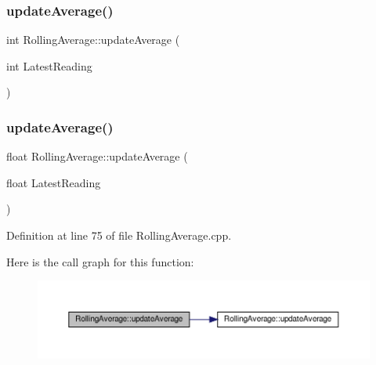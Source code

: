 \subsubsection{\texorpdfstring{update\+Average()}{updateAverage()}\hspace{0.1cm}{\footnotesize\ttfamily [2/4]}}
{\footnotesize\ttfamily int Rolling\+Average\+::update\+Average (\begin{DoxyParamCaption}\item[{int}]{Latest\+Reading }\end{DoxyParamCaption})}

\mbox{\label{class_rolling_average_a8b3550acbd16b942b565150334205d52}} 
\subsubsection{\texorpdfstring{update\+Average()}{updateAverage()}\hspace{0.1cm}{\footnotesize\ttfamily [3/4]}}
{\footnotesize\ttfamily float Rolling\+Average\+::update\+Average (\begin{DoxyParamCaption}\item[{float}]{Latest\+Reading }\end{DoxyParamCaption})}



Definition at line 75 of file Rolling\+Average.\+cpp.

Here is the call graph for this function\+:
\nopagebreak
\begin{figure}[H]
\begin{center}
\leavevmode
\includegraphics[width=350pt]{class_rolling_average_a8b3550acbd16b942b565150334205d52_cgraph}
\end{center}
\end{figure}
\mbox{\label{class_rolling_average_a8b3550acbd16b942b565150334205d52}} 
